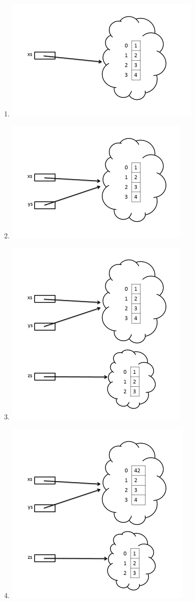 \Subtask \begin{enumerate}
\item \includegraphics[scale=1.2]{../img/w05-solutions/memory-pic-2}
\item \includegraphics[scale=1.2]{../img/w05-solutions/memory-pic-3}
\item \includegraphics[scale=1.2]{../img/w05-solutions/memory-pic-4}
\item \includegraphics[scale=1.2]{../img/w05-solutions/memory-pic-5}

\end{enumerate}

